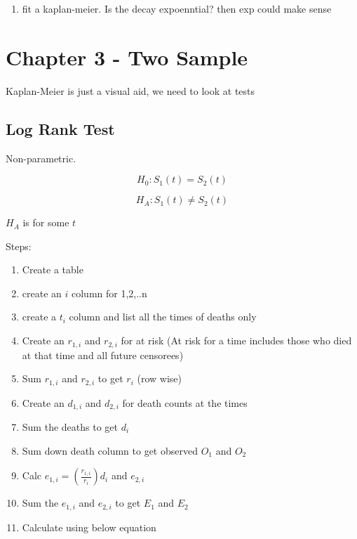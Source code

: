 \documentclass[
  letterpaper,
  DIV=11,
  numbers=noendperiod]{scrreprt}
\providecommand{\tightlist}{%
  \setlength{\itemsep}{0pt}\setlength{\parskip}{0pt}}\usepackage{longtable,booktabs,array}
\begin{document}
\begin{enumerate}
\def\labelenumi{\arabic{enumi}.}
\tightlist
\item
  fit a kaplan-meier. Is the decay expoenntial? then exp could make
  sense
\end{enumerate}

\hypertarget{chapter-3---two-sample}{%
\section{Chapter 3 - Two Sample}\label{chapter-3---two-sample}}

Kaplan-Meier is just a visual aid, we need to look at tests

\hypertarget{log-rank-test}{%
\subsection{Log Rank Test}\label{log-rank-test}}

Non-parametric.

\[ H_0 : S_1(t) = S_2(t)\]

\[ H_A : S_1(t) \neq S_2(t)\]

\(H_A\) is for some \(t\)

Steps:

\begin{enumerate}
\def\labelenumi{\arabic{enumi})}
\tightlist
\item
  Create a table
\item
  create an \(i\) column for 1,2,..n
\item
  create a \(t_i\) column and list all the times of deaths only
\item
  Create an \(r_{1,i}\) and \(r_{2,i}\) for at risk (At risk for a time
  includes those who died at that time and all future censorees)
\item
  Sum \(r_{1,i}\) and \(r_{2,i}\) to get \(r_i\) (row wise)
\item
  Create an \(d_{1,i}\) and \(d_{2,i}\) for death counts at the times
\item
  Sum the deaths to get \(d_i\)
\item
  Sum down death column to get observed \(O_1\) and \(O_2\)
\item
  Calc \(e_{1,i} = (\frac{r_{1,i}}{r_i})d_i\) and \(e_{2,i}\)
\item
  Sum the \(e_{1,i}\) and \(e_{2,i}\) to get \(E_1\) and \(E_2\)
\item
  Calculate using below equation
\end{enumerate}
\end{document}
